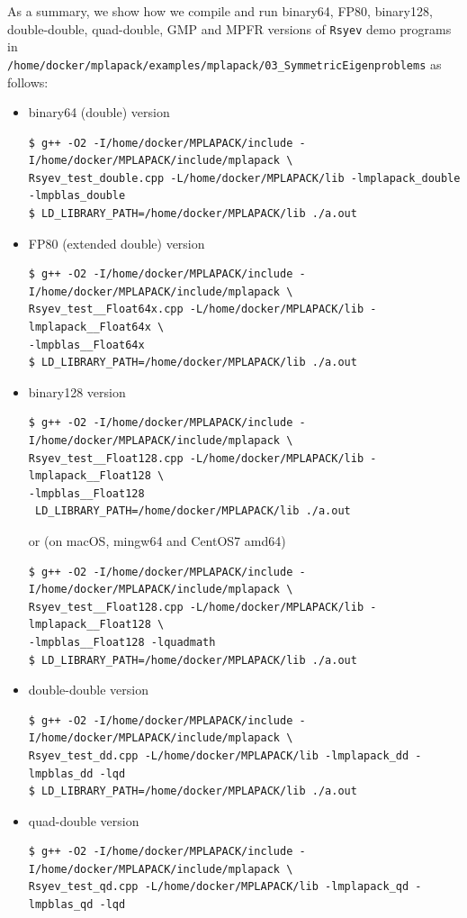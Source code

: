 \documentclass[12pt]{article}
\begin{document}
As a summary, we show how we compile and run binary64, FP80, binary128, double-double, quad-double, GMP and MPFR versions of {\tt Rsyev} demo programs in \\
{\tt /home/docker/mplapack/examples/mplapack/03\_SymmetricEigenproblems} as follows:
\begin{itemize}
    \item binary64 (double) version
\begin{verbatim}
$ g++ -O2 -I/home/docker/MPLAPACK/include -I/home/docker/MPLAPACK/include/mplapack \
Rsyev_test_double.cpp -L/home/docker/MPLAPACK/lib -lmplapack_double -lmpblas_double
$ LD_LIBRARY_PATH=/home/docker/MPLAPACK/lib ./a.out
\end{verbatim}
\item FP80 (extended double) version
\begin{verbatim}
$ g++ -O2 -I/home/docker/MPLAPACK/include -I/home/docker/MPLAPACK/include/mplapack \
Rsyev_test__Float64x.cpp -L/home/docker/MPLAPACK/lib -lmplapack__Float64x \
-lmpblas__Float64x
$ LD_LIBRARY_PATH=/home/docker/MPLAPACK/lib ./a.out
\end{verbatim}
\item binary128 version
\begin{verbatim}
$ g++ -O2 -I/home/docker/MPLAPACK/include -I/home/docker/MPLAPACK/include/mplapack \
Rsyev_test__Float128.cpp -L/home/docker/MPLAPACK/lib -lmplapack__Float128 \
-lmpblas__Float128
 LD_LIBRARY_PATH=/home/docker/MPLAPACK/lib ./a.out
\end{verbatim}
or (on macOS, mingw64 and CentOS7 amd64)
\begin{verbatim}
$ g++ -O2 -I/home/docker/MPLAPACK/include -I/home/docker/MPLAPACK/include/mplapack \
Rsyev_test__Float128.cpp -L/home/docker/MPLAPACK/lib -lmplapack__Float128 \
-lmpblas__Float128 -lquadmath
$ LD_LIBRARY_PATH=/home/docker/MPLAPACK/lib ./a.out
\end{verbatim}
\item double-double version
\begin{verbatim}
$ g++ -O2 -I/home/docker/MPLAPACK/include -I/home/docker/MPLAPACK/include/mplapack \
Rsyev_test_dd.cpp -L/home/docker/MPLAPACK/lib -lmplapack_dd -lmpblas_dd -lqd
$ LD_LIBRARY_PATH=/home/docker/MPLAPACK/lib ./a.out
\end{verbatim}
\item quad-double version
\begin{verbatim}
$ g++ -O2 -I/home/docker/MPLAPACK/include -I/home/docker/MPLAPACK/include/mplapack \
Rsyev_test_qd.cpp -L/home/docker/MPLAPACK/lib -lmplapack_qd -lmpblas_qd -lqd

\end{verbatim}
\end{itemize}
\end{document}
